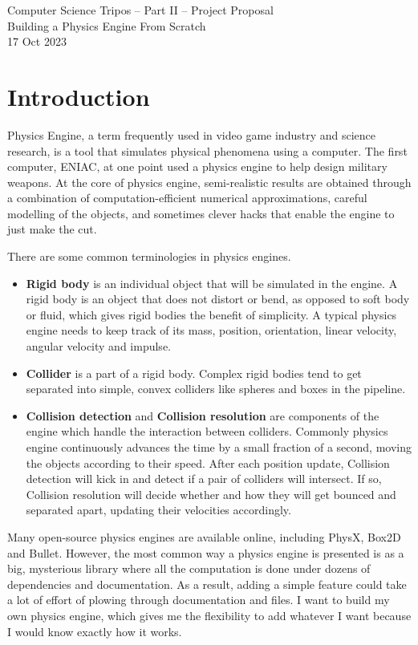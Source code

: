 \documentclass[12pt,a4paper,twoside]{article}
\begin{document}
\begin{center}
\Large
Computer Science Tripos -- Part II -- Project Proposal\\[4mm]
\LARGE
Building a Physics Engine From Scratch\\[4mm]
\large
17 Oct 2023
\end{center}
\vspace{5mm}
\section*{Introduction}
Physics Engine, a term frequently used in video game industry and science research, 
is a tool that simulates physical phenomena using a computer.
The first computer, ENIAC, at one point used a physics engine to help design military weapons\cite{rojas2002first}.
At the core of physics engine, semi-realistic results are obtained through a combination of 
computation-efficient numerical approximations, 
careful modelling of the objects, 
and sometimes clever hacks that enable the engine to just make the cut.

There are some common terminologies in physics engines.
\begin{itemize}
\item \textbf{Rigid body} is an individual object that will be simulated in the engine.
A rigid body is an object that does not distort or bend, as opposed to soft body or fluid, 
which gives rigid bodies the benefit of simplicity.
A typical physics engine needs to keep track of its mass, position, orientation, linear velocity, angular velocity and impulse.
\item \textbf{Collider} is a part of a rigid body.
Complex rigid bodies tend to get separated into simple, convex colliders like spheres and boxes in the pipeline.
\item \textbf{Collision detection} and \textbf{Collision resolution} are components of the engine which handle the interaction between colliders.
Commonly physics engine continuously advances the time by a small fraction of a second, moving the objects according to their speed.
After each position update, Collision detection will kick in and detect if a pair of colliders will intersect.
If so, Collision resolution will decide whether and how they will get bounced and separated apart, 
updating their velocities accordingly.
\end{itemize}

Many open-source physics engines are available online, including PhysX\cite{physx}, 
Box2D\cite{box2d} and Bullet\cite{bullet}.
However, the most common way a physics engine is presented is as a big, mysterious library 
where all the computation is done under dozens of dependencies and documentation.
As a result, adding a simple feature could take a lot of effort of plowing through documentation and files.
I want to build my own physics engine, 
which gives me the flexibility to add whatever I want because I would know exactly how it works.
\end{document}
